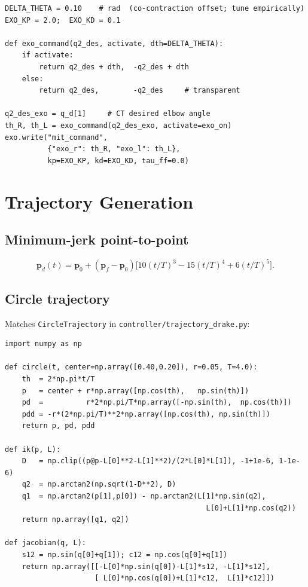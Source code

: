 \documentclass[11pt,a4paper]{article}
\newcommand{\vp}{\bm{p}}
\begin{document}
\begin{lstlisting}[caption={Exo co-contraction activation (Phase~2 with exo).}]
DELTA_THETA = 0.10    # rad  (co-contraction offset; tune empirically)
EXO_KP = 2.0;  EXO_KD = 0.1

def exo_command(q2_des, activate, dth=DELTA_THETA):
    if activate:
        return q2_des + dth,  -q2_des + dth
    else:
        return q2_des,        -q2_des     # transparent

q2_des_exo = q_d[1]     # CT desired elbow angle
th_R, th_L = exo_command(q2_des_exo, activate=exo_on)
exo.write("mit_command",
          {"exo_r": th_R, "exo_l": th_L},
          kp=EXO_KP, kd=EXO_KD, tau_ff=0.0)
\end{lstlisting}

\section{Trajectory Generation}
\label{sec:traj}

\subsection{Minimum-jerk point-to-point}

\begin{equation}
  \vp_d(t) = \vp_0 + (\vp_f{-}\vp_0)
    \bigl[10(t/T)^3 - 15(t/T)^4 + 6(t/T)^5\bigr].
  \label{eq:minjerk}
\end{equation}

\subsection{Circle trajectory}

Matches \texttt{CircleTrajectory} in \texttt{controller/trajectory\_drake.py}:

\begin{lstlisting}[caption={Circle trajectory + IK for hardware.}]
import numpy as np

def circle(t, center=np.array([0.40,0.20]), r=0.05, T=4.0):
    th  = 2*np.pi*t/T
    p   = center + r*np.array([np.cos(th),   np.sin(th)])
    pd  =          r*2*np.pi/T*np.array([-np.sin(th),  np.cos(th)])
    pdd = -r*(2*np.pi/T)**2*np.array([np.cos(th), np.sin(th)])
    return p, pd, pdd

def ik(p, L):
    D   = np.clip((p@p-L[0]**2-L[1]**2)/(2*L[0]*L[1]), -1+1e-6, 1-1e-6)
    q2  = np.arctan2(np.sqrt(1-D**2), D)
    q1  = np.arctan2(p[1],p[0]) - np.arctan2(L[1]*np.sin(q2),
                                               L[0]+L[1]*np.cos(q2))
    return np.array([q1, q2])

def jacobian(q, L):
    s12 = np.sin(q[0]+q[1]); c12 = np.cos(q[0]+q[1])
    return np.array([[-L[0]*np.sin(q[0])-L[1]*s12, -L[1]*s12],
                     [ L[0]*np.cos(q[0])+L[1]*c12,  L[1]*c12]])
\end{lstlisting}
\end{document}
